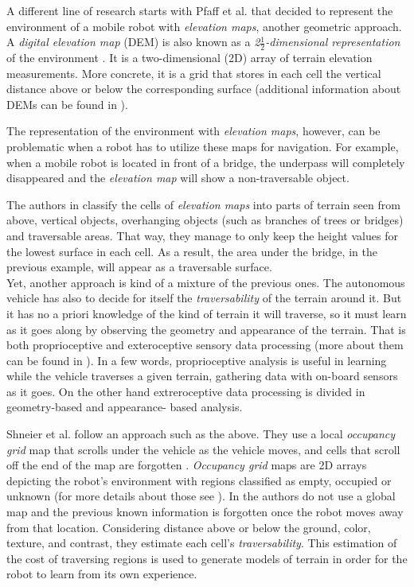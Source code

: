 \documentclass[12pt,a4paper]{report}
\newcommand{\etal}[1]{#1 et al.}
\newcommand{\term}{\textit}
\newcommand{\acronym}{\MakeUppercase}
\newcommand{\itfrac}[2]{\frac{\textit{#1}}{\textit{#2}}}
\begin{document}
	A different line of research starts with \etal{Pfaff} that decided to represent 
	the environment of a mobile robot with \term{elevation maps}, another geometric 
	approach. A \term{digital elevation map} (\acronym{dem}) is also known as a
	\term{2\(\itfrac{1}{2}\)-dimensional representation} of the environment 
	\cite{Pfaff}. It is a two-dimensional (\acronym{2d}) array of terrain elevation 
	measurements. More concrete, it is a grid that stores in each cell the vertical 
	distance above or below the corresponding surface (additional information about 
	\acronym{dem}s can be found in \cite{Kweon}). 
	\par 
	The representation of the environment with \term{elevation maps}, however, can 
	be problematic when a robot has to utilize these maps for navigation. For 
	example, when a mobile robot is located in front of a bridge, the underpass will 
	completely disappeared and the \term{elevation map} will show a non-traversable 
	object.
	\par
	The authors in \cite{Pfaff} classify the cells of \term{elevation maps} into 
	parts of terrain seen from above, vertical objects,	overhanging objects (such as 
	branches of trees or bridges) and traversable areas. That way, they manage to 
	only keep the height values for the lowest surface in each cell. As a result, 
	the area under the bridge, in the previous example, will appear as a traversable 
	surface.
	\\
	
	Yet, another approach is kind of a mixture of the previous ones. The autonomous 
	vehicle has also to decide for itself the \term{traversability} of the terrain 
	around it. But it has no a priori knowledge of the kind of terrain it will 
	traverse, so it must learn as it goes along by observing the geometry and 
	appearance of the terrain. That is both proprioceptive and exteroceptive sensory 
	data processing (more about them can be found in \cite{Papadakis}). In a few 
	words, proprioceptive analysis is useful in learning while the vehicle traverses 
	a given terrain, gathering data with on-board sensors as it goes. On the other 
	hand extreroceptive data processing is divided in geometry-based and appearance-
	based analysis. 
	\par
	\etal{Shneier} follow an approach such as the above. They use a local 
	\term{occupancy grid} map that scrolls under the vehicle as the vehicle moves,
	and cells that scroll off the end of the map are forgotten \cite{Shneier}. 
	\term{Occupancy grid} maps are \acronym{2d} arrays depicting the robot’s 
	environment with regions classified as empty, occupied or unknown (for more 
	details about those see \cite{Moravec}). In \cite{Shneier} the authors do not 
	use a global map and the previous known information is forgotten once the robot 
	moves away from that location. Considering distance above or below the ground, 
	color, texture, and contrast, they estimate each cell’s \term{traversability}. 
	This estimation of the cost of traversing regions is used to generate models of 
	terrain in order for the robot to learn from its own experience.
	\\
	
\end{document}
